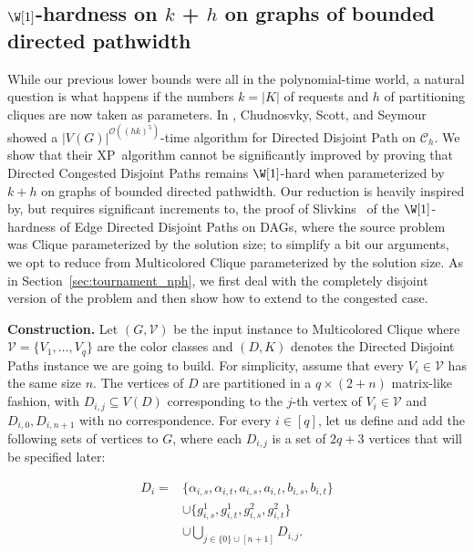 \documentclass[a4paper,UKenglish,cleveref, autoref, thm-restate]{lipics-v2021}
\renewcommand{\XP}{{\sf XP}\xspace}
\newcommand{\pname}[1]{{\sc #1}}
\newcommand{\bigO}[1]{\mathcal{O}\!\left(#1\right)}
\begin{document}
\subsection{$\W[1]$-hardness on $k$ + $h$ on graphs of bounded directed pathwidth}
While our previous lower bounds were all in the polynomial-time world, a natural question
is what happens if the numbers $k = |K|$ of requests and $h$ of partitioning cliques are
now taken as parameters.
In \cite{chudnovsky_union_of_tournaments}, Chudnosvky, Scott, and Seymour showed a
$|V(G)|^{\bigO{(hk)^5}}$-time algorithm for \pname{Directed Disjoint Path} on
$\mathcal{C}_h$.
We show that their \XP\ algorithm cannot be significantly improved by proving that \pname{Directed
Congested Disjoint Paths} remains $\W[1]$-hard when parameterized by $k + h$ on graphs of
bounded directed pathwidth.
Our reduction is heavily inspired by, but requires significant increments to, the proof
of Slivkins~\cite{Slivkins2010} of the
$\W[1]$-hardness of \pname{Edge Directed Disjoint Paths} on DAGs, where the source
problem was \pname{Clique} parameterized by the solution size; to simplify a bit our
arguments, we opt to reduce from \pname{Multicolored Clique} parameterized by the solution size.
As in Section~\ref{sec:tournament_nph}, we first deal with the completely disjoint
version of the problem and then show how to extend to the congested case.

\noindent\textbf{Construction.} Let $(G, \mathcal{V})$ be the input instance to
\pname{Multicolored Clique} where $\mathcal{V} = \{V_1, \dots, V_q\}$ are the color
classes and $(D, K)$ denotes the \pname{Directed Disjoint Paths} instance we are going to build.
For simplicity, assume that every $V_i \in \mathcal{V}$ has the same size $n$.
The vertices of $D$ are partitioned in a $q \times (2 + n)$ matrix-like
fashion, with $D_{i,j} \subseteq V(D)$ corresponding to the $j$-th vertex of $V_i \in
\mathcal{V}$ and $D_{i,0}, D_{i, n+1}$ with no correspondence.
For every $i \in [q]$, let us define and add the following sets of vertices to $G$, where
each $D_{i,j}$ is a set of $2q + 3$ vertices that will be specified later:

\begin{align*}
  D_i = &\{\alpha_{i,s}, \alpha_{i,t}, a_{i,s}, a_{i,t}, b_{i,s},  b_{i,t}\}\\
  &\cup \{g^1_{i, s}, g^1_{i, t}, g^2_{i, s}, g^2_{i, t}\}\\
  &\cup \bigcup_{j \in \{0\} \cup [n+1]} D_{i,j}.
\end{align*}
\end{document}
